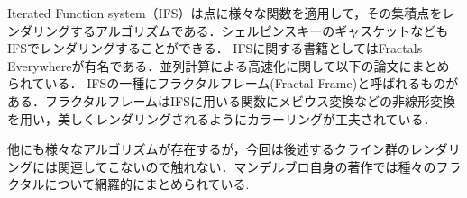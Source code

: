 Iterated Function system（IFS）は点に様々な関数を適用して，その集積点をレンダリングするアルゴリズムである．シェルピンスキーのギャスケットなどもIFSでレンダリングすることができる．
IFSに関する書籍としてはFractals Everywhere\cite{fractalsEverywhere}が有名である．並列計算による高速化に関して以下の論文にまとめられている\cite{highPerformanceIFS}\cite{GPUIFS}．
IFSの一種にフラクタルフレーム(Fractal Frame)\cite{fractalFrame}と呼ばれるものがある．フラクタルフレームはIFSに用いる関数にメビウス変換などの非線形変換を用い，美しくレンダリングされるようにカラーリングが工夫されている．

他にも様々なアルゴリズムが存在するが，今回は後述するクライン群のレンダリングには関連してこないので触れない．マンデルブロ自身の著作\cite{fractal}では種々のフラクタルについて網羅的にまとめられている.

